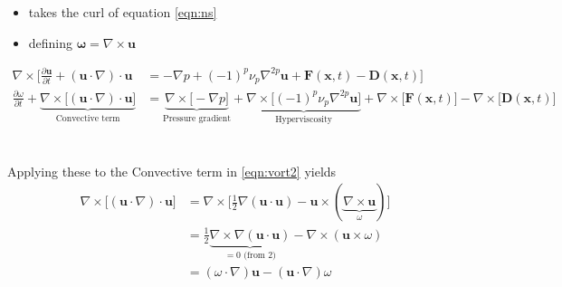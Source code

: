 \begin{itemize}
 \item takes the curl of equation \ref{eqn:ns}
 \item defining $\mathbf{\omega} = \nabla \times \mathbf{u}$
\end{itemize}
\begin{align}
\nabla \times \bigg[ \frac{\partial \mathbf{u}}{\partial t} + (\mathbf{u} \cdot \nabla)\cdot \mathbf{u} &= - \nabla p + (-1)^p \nu_p \nabla^{2 p} \mathbf{u} + \mathbf{F}(\mathbf{x},t) - \mathbf{D}(\mathbf{x},t) \bigg] \label{eqn:vort1}\\
\frac{\partial \omega}{\partial t} + \underbrace{\nabla \times \bigg[ (\mathbf{u} \cdot \nabla)\cdot \mathbf{u} \bigg]}_\text{Convective term} &= \underbrace{\nabla \times \bigg[- \nabla p\bigg]}_\text{Pressure gradient} + \underbrace{\nabla \times \bigg[(-1)^p \nu_p \nabla^{2 p} \mathbf{u}\bigg]}_\text{Hyperviscosity} + \nabla \times \bigg[\mathbf{F}(\mathbf{x},t)\bigg] - \nabla \times \bigg[\mathbf{D}(\mathbf{x},t) \bigg]  \label{eqn:vort2}
\end{align}
\\
\\
Applying these to the Convective term in \ref{eqn:vort2} yields 
\begin{align*}
 \nabla \times \bigg[ (\mathbf{u} \cdot \nabla)\cdot \mathbf{u} \bigg] &= \nabla \times \bigg[ \frac{1}{2}\nabla(\mathbf{u} \cdot \mathbf{u}) - \mathbf{u} \times (\underbrace{\nabla \times \mathbf{u}}_\text{$\omega$}) \bigg]\\
 &= \frac{1}{2} \underbrace{\nabla \times \nabla(\mathbf{u} \cdot \mathbf{u})}_\text{$= 0$ (from 2)} - \nabla \times (\mathbf{u} \times \omega) \\
 &= (\omega \cdot \nabla)\mathbf{u} - (\mathbf{u} \cdot \nabla)\omega
\end{align*}

